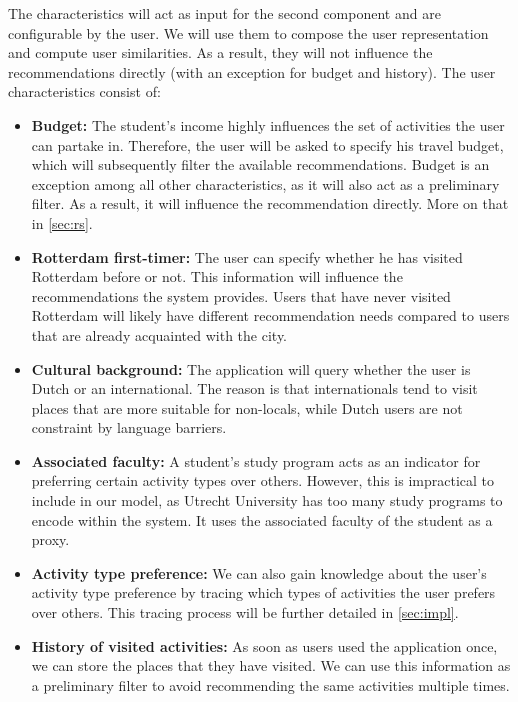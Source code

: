 \documentclass[11pt,a4paper,oneside]{article}
\begin{document}
The characteristics will act as input for the second component and are configurable by the user. We will use them to compose the user representation and compute user similarities. As a result, they will not influence the recommendations directly (with an exception for budget and history). The user characteristics consist of: 
\begin{itemize}
\item \textbf{Budget:} The student's income highly influences the set of activities the user can partake in. Therefore, the user will be asked to specify his travel budget, which will subsequently filter the available recommendations. Budget is an exception among all other characteristics, as it will also act as a preliminary filter. As a result, it will influence the recommendation directly. More on that in \autoref{sec:rs}.

\item \textbf{Rotterdam first-timer:} The user can specify whether he has visited Rotterdam before or not. This information will influence the recommendations the system provides. Users that have never visited Rotterdam will likely have different recommendation needs compared to users that are already acquainted with the city.

\item \textbf{Cultural background:} The application will query whether the user is Dutch or an international. The reason is that internationals tend to visit places that are more suitable for non-locals, while Dutch users are not constraint by language barriers.

\item \textbf{Associated faculty:} A student's study program acts as an indicator for preferring certain activity types over others. However, this is impractical to include in our model, as Utrecht University has too many study programs to encode within the system. It uses the associated faculty of the student as a proxy.

\item \textbf{Activity type preference:} We can also gain knowledge about the user's activity type preference by tracing which types of activities the user prefers over others. This tracing process will be further detailed in \autoref{sec:impl}.

\item \textbf{History of visited activities:} As soon as users used the application once, we can store the places that they have visited. We can use this information as a preliminary filter to avoid recommending the same activities multiple times.  
\end{itemize}
\end{document}

